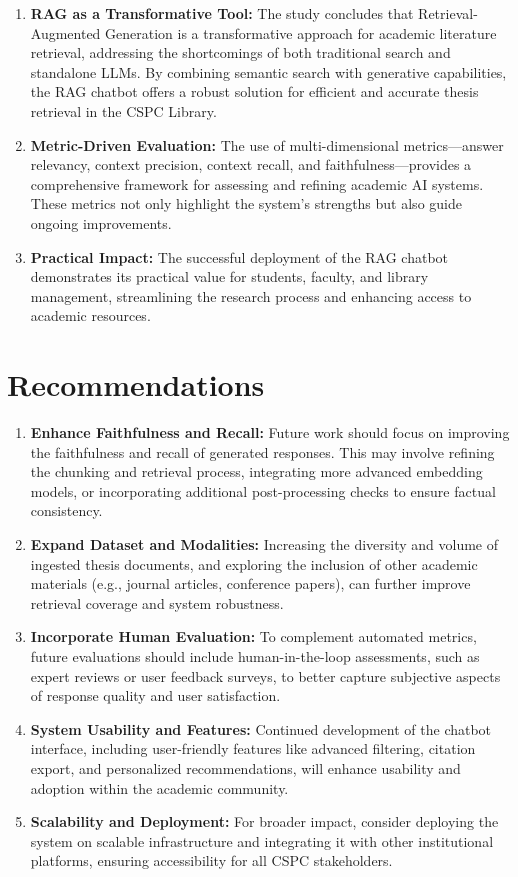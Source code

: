 \begin{refsection}
\begin{enumerate}
    \item \textbf{RAG as a Transformative Tool:} The study concludes that Retrieval-Augmented Generation is a transformative approach for academic literature retrieval, addressing the shortcomings of both traditional search and standalone LLMs. By combining semantic search with generative capabilities, the RAG chatbot offers a robust solution for efficient and accurate thesis retrieval in the CSPC Library.
    \item \textbf{Metric-Driven Evaluation:} The use of multi-dimensional metrics---answer relevancy, context precision, context recall, and faithfulness---provides a comprehensive framework for assessing and refining academic AI systems. These metrics not only highlight the system’s strengths but also guide ongoing improvements.
    \item \textbf{Practical Impact:} The successful deployment of the RAG chatbot demonstrates its practical value for students, faculty, and library management, streamlining the research process and enhancing access to academic resources.
\end{enumerate}

\section*{Recommendations}

\begin{enumerate}
    \item \textbf{Enhance Faithfulness and Recall:} Future work should focus on improving the faithfulness and recall of generated responses. This may involve refining the chunking and retrieval process, integrating more advanced embedding models, or incorporating additional post-processing checks to ensure factual consistency.
    \item \textbf{Expand Dataset and Modalities:} Increasing the diversity and volume of ingested thesis documents, and exploring the inclusion of other academic materials (e.g., journal articles, conference papers), can further improve retrieval coverage and system robustness.
    \item \textbf{Incorporate Human Evaluation:} To complement automated metrics, future evaluations should include human-in-the-loop assessments, such as expert reviews or user feedback surveys, to better capture subjective aspects of response quality and user satisfaction.
    \item \textbf{System Usability and Features:} Continued development of the chatbot interface, including user-friendly features like advanced filtering, citation export, and personalized recommendations, will enhance usability and adoption within the academic community.
    \item \textbf{Scalability and Deployment:} For broader impact, consider deploying the system on scalable infrastructure and integrating it with other institutional platforms, ensuring accessibility for all CSPC stakeholders.
\end{enumerate}

\clearpage

\printbibliography[heading=subbibintoc, title={\centering Notes}]
\end{refsection}